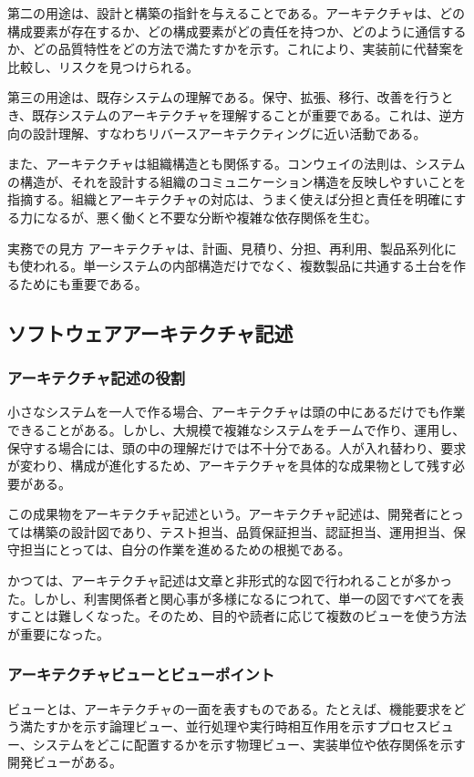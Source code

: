 \documentclass[a4paper,11pt]{ltjsarticle}
\numberwithin{figure}{section}
\numberwithin{table}{section}
\begin{document}
第二の用途は、設計と構築の指針を与えることである。アーキテクチャは、どの構成要素が存在するか、どの構成要素がどの責任を持つか、どのように通信するか、どの品質特性をどの方法で満たすかを示す。これにより、実装前に代替案を比較し、リスクを見つけられる。

第三の用途は、既存システムの理解である。保守、拡張、移行、改善を行うとき、既存システムのアーキテクチャを理解することが重要である。これは、逆方向の設計理解、すなわちリバースアーキテクティングに近い活動である。

また、アーキテクチャは組織構造とも関係する。コンウェイの法則は、システムの構造が、それを設計する組織のコミュニケーション構造を反映しやすいことを指摘する。組織とアーキテクチャの対応は、うまく使えば分担と責任を明確にする力になるが、悪く働くと不要な分断や複雑な依存関係を生む。

\begin{statementbox}{実務での見方}
アーキテクチャは、計画、見積り、分担、再利用、製品系列化にも使われる。単一システムの内部構造だけでなく、複数製品に共通する土台を作るためにも重要である。
\end{statementbox}

\subsection{ソフトウェアアーキテクチャ記述}

\subsubsection*{アーキテクチャ記述の役割}
小さなシステムを一人で作る場合、アーキテクチャは頭の中にあるだけでも作業できることがある。しかし、大規模で複雑なシステムをチームで作り、運用し、保守する場合には、頭の中の理解だけでは不十分である。人が入れ替わり、要求が変わり、構成が進化するため、アーキテクチャを具体的な成果物として残す必要がある。

この成果物をアーキテクチャ記述という。アーキテクチャ記述は、開発者にとっては構築の設計図であり、テスト担当、品質保証担当、認証担当、運用担当、保守担当にとっては、自分の作業を進めるための根拠である。

かつては、アーキテクチャ記述は文章と非形式的な図で行われることが多かった。しかし、利害関係者と関心事が多様になるにつれて、単一の図ですべてを表すことは難しくなった。そのため、目的や読者に応じて複数のビューを使う方法が重要になった。

\subsubsection{アーキテクチャビューとビューポイント}
ビューとは、アーキテクチャの一面を表すものである。たとえば、機能要求をどう満たすかを示す論理ビュー、並行処理や実行時相互作用を示すプロセスビュー、システムをどこに配置するかを示す物理ビュー、実装単位や依存関係を示す開発ビューがある。
\end{document}
